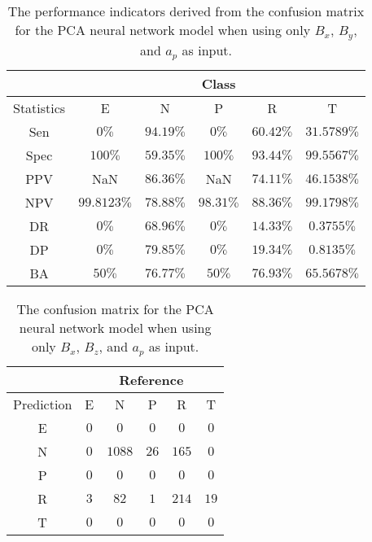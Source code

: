 \begin{table}[!ht]
	\centering
	\begin{tabular}{|c|c|c|c|c|c|}
		\hline
		 & \multicolumn{5}{c|}{Class} \\ \hline
		Statistics & E & N & P & R & T \\ \hline
		Sen & $0\%$ & $94.19\%$ & $0\%$ & $60.42\%$ & $31.5789\%$ \\ \hline
		Spec & $100\%$ & $59.35\%$ & $100\%$ & $93.44\%$ & $99.5567\%$ \\ \hline
		PPV & NaN & $86.36\%$ & NaN & $74.11\%$ & $46.1538\%$ \\ \hline
		NPV & $99.8123\%$ & $78.88\%$ & $98.31\%$ & $88.36\%$ & $99.1798\%$ \\ \hline
		DR & $0\%$ & $68.96\%$ & $0\%$ & $14.33\%$ & $0.3755\%$ \\ \hline
		DP & $0\%$ & $79.85\%$ & $0\%$ & $19.34\%$ & $0.8135\%$ \\ \hline
		BA & $50\%$ & $76.77\%$ & $50\%$ & $76.93\%$ & $65.5678\%$ \\ \hline
	\end{tabular}
	\caption{The performance indicators derived from the confusion matrix for the PCA neural network model when using only $B_{x}$, $B_{y}$, and $a_{p}$ as input.}
	\label{tab:cs:reverse:xyap:pcaNNet}
\end{table}

\begin{table}[!ht]
	\centering
	\begin{tabular}{|c|c|c|c|c|c|}
		\hline
		 & \multicolumn{5}{|c|}{Reference} \\ \hline
		 Prediction & E & N & P & R & T \\ \hline
		 E & $0$ & $0$ & $0$ & $0$ & $0$ \\ \hline
		 N & $0$ & $1088$ & $26$ & $165$ & $0$ \\ \hline
		 P & $0$ & $0$ & $0$ & $0$ & $0$ \\ \hline
		 R & $3$ & $82$ & $1$ & $214$ & $19$ \\ \hline
		 T & $0$ & $0$ & $0$ & $0$ & $0$ \\ \hline
	\end{tabular}
	\caption{The confusion matrix for the PCA neural network model when using only $B_{x}$, $B_{z}$, and $a_{p}$ as input.}
	\label{tab:cm:xzap:pcaNNet}
\end{table}

